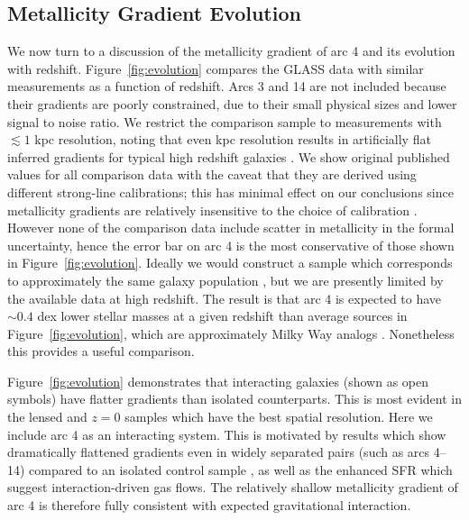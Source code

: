 \subsection{Metallicity Gradient Evolution}

We now turn to a discussion of the metallicity gradient of arc 4 and its evolution with redshift.
Figure~\ref{fig:evolution} compares the GLASS data with similar measurements as a function of redshift. Arcs 3
and 14 are not included because their gradients are poorly constrained, due to their small physical sizes and
lower signal to noise ratio.  We restrict the comparison sample to measurements with $\lesssim1$ kpc resolution,
noting that even kpc resolution results in artificially flat inferred gradients for typical high redshift
galaxies \citep[e.g.,][]{Yuan2013,Stott2014}. We show original published values for all comparison data with the
caveat that they are derived using different strong-line calibrations; this has minimal effect on our conclusions
since metallicity gradients are relatively insensitive to the choice of calibration \citep{Jones2013}. However
none of the comparison data include scatter in metallicity in the formal uncertainty, hence the error bar on arc
4 is the most conservative of those shown in Figure~\ref{fig:evolution}.  Ideally we would construct a sample
which corresponds to approximately the same galaxy population \citep[as was done in][]{Jones2013}, but we are
presently limited by the available data at high redshift. The result is that arc 4 is expected to have $\sim0.4$
dex lower stellar masses at a given redshift than average sources in Figure~\ref{fig:evolution}, which are
approximately Milky Way analogs \citep[based on abundance matching; e.g.,][]{Behroozi2013}. Nonetheless this
provides a useful comparison.

Figure~\ref{fig:evolution} demonstrates that interacting galaxies (shown as open symbols) have flatter gradients
than isolated counterparts. This is most evident in the lensed and $z=0$ samples which have the best spatial
resolution. Here we include arc 4 as an interacting system. This is motivated by results which show dramatically
flattened gradients even in widely separated pairs (such as arcs 4--14) compared to an isolated control sample
\citep[][and references therein]{Rich2012}, as well as the enhanced SFR which suggest interaction-driven gas
flows. The relatively shallow metallicity gradient of arc 4 is therefore fully consistent with expected
gravitational interaction.

